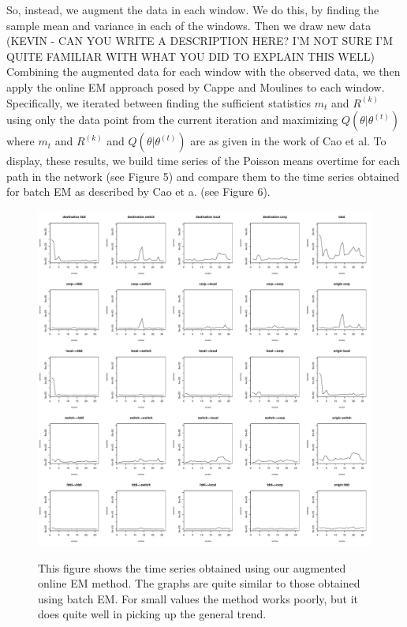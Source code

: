 \documentclass[12pt]{article}
\begin{document}
So, instead, we augment the data in each window. We do this, by finding the sample mean and variance in each of the windows. Then we draw new data (KEVIN - CAN YOU WRITE A DESCRIPTION HERE? I'M NOT SURE I'M QUITE FAMILIAR WITH WHAT YOU DID TO EXPLAIN THIS WELL) Combining the augmented data for each window with the observed data, we then apply the online EM approach posed by Cappe and Moulines to each window. Specifically, we iterated between finding the sufficient statistics $m_{t}$ and $R^{(k)}$ using only the data point from the current iteration and maximizing $Q(\theta | \theta^{(t)})$ where $m_{t}$ and $R^{(k)}$ and  $Q(\theta | \theta^{(t)})$ are as given in the work of Cao et al. To display, these results, we build time series of the Poisson means overtime  for each path in the network (see Figure 5) and compare them to the time series obtained for batch EM as described by Cao et a. (see Figure 6). \\

\begin{figure}[b!]
\centering
\includegraphics[width = \textwidth]{novelty_online_em.PDF}\\
\caption{This figure shows the time series obtained using our augmented online EM method. The graphs are quite similar to those obtained using batch EM. For small values the method works poorly, but it does quite well in picking up the general trend.} \label{f2}
\end{figure}
\end{document}
